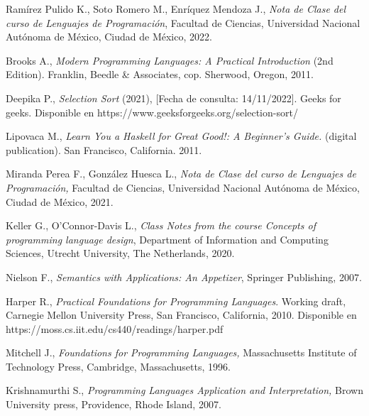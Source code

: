 \begin{thebibliography}{11}

    \label{sec:1}
    \hypertarget{1}{}
    Ramírez Pulido K., Soto Romero M., Enríquez Mendoza J., \textit{Nota de Clase del curso de Lenguajes
    de Programación}, Facultad de Ciencias, Universidad Nacional Autónoma de México, Ciudad de México, 2022.

    
    \label{sec:2}
    \hypertarget{2}{}
    Brooks A., \textit{Modern Programming Languages: A Practical Introduction} (2nd Edition). Franklin, Beedle \& Associates, cop. Sherwood, Oregon, 2011.


    \label{sec:3}
    \hypertarget{3}{}
    Deepika P., \textit{Selection Sort} (2021), [Fecha de consulta: 14/11/2022]. Geeks for geeks. Disponible en https://www.geeksforgeeks.org/selection-sort/
 
    \label{sec:4}
    \hypertarget{4}{}
    Lipovaca M., \textit{Learn You a Haskell for Great Good!: A Beginner's Guide.} (digital publication). San Francisco, California. 2011.
    
    \label{sec:5}
    \hypertarget{5}{}
     Miranda Perea F., González Huesca L., \textit{Nota de Clase del curso de Lenguajes de Programación,}
     Facultad de Ciencias, Universidad Nacional Autónoma de México, Ciudad de México, 2021.


    \label{sec:6}
    \hypertarget{6}{}
    Keller G., O'Connor-Davis L., \textit{Class Notes from the course Concepts of programming language design}, Department of Information and Computing Sciences, Utrecht University, The Netherlands,  2020.

    
    \label{swann}
    \label{sec:7}
    \hypertarget{7}{}
    Nielson F., \textit{Semantics with Applications: An Appetizer}, Springer Publishing, 2007.

    
    \label{sec:8}
    \hypertarget{8}{}
    Harper R., \textit{Practical Foundations for Programming Languages}. Working draft, Carnegie Mellon University Press, San Francisco, California, 2010. Disponible en https://moss.cs.iit.edu/cs440/readings/harper.pdf

    
    \label{sec:9}
    \hypertarget{9}{}
    Mitchell J., \textit{Foundations for Programming Languages,} Massachusetts Institute of Technology Press, Cambridge, Massachusetts, 1996.
    
    
    \label{sec:10}
    \hypertarget{10}{}
    Krishnamurthi S., \textit{Programming Languages Application and Interpretation,} Brown University press, Providence, Rhode Island, 2007.


\end{thebibliography}
